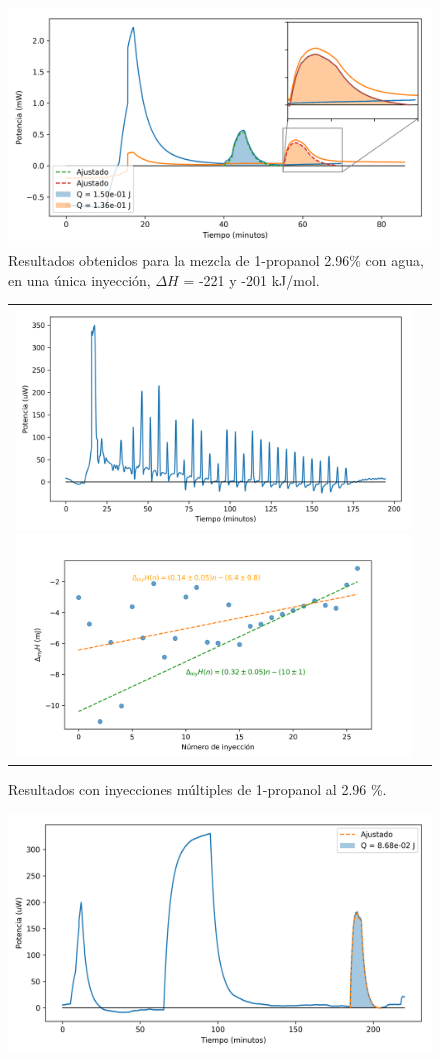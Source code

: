 \documentclass[a0]{sciposter}
\newcommand{\figwidth}{0.7\linewidth}
\begin{document}
\begin{multicols}{3}
	\begin{figure}[h]
		\centering
		\includegraphics[width=\figwidth]{../Data/ChemicalCalibrations/singlePropanol}
		\caption{Resultados obtenidos para la mezcla de 1-propanol 2.96\% con agua, en una \'unica inyecci\'on, $\Delta H$ = -221 y -201 kJ/mol.}
	\end{figure}
	\begin{figure}[h]
		\centering
		\begin{tabular}{cc}
			\includegraphics[width=0.47\linewidth]{../Data/ChemicalCalibrations/multiple}
			\includegraphics[width=0.53\linewidth]{../Data/ChemicalCalibrations/multipleInt}
		\end{tabular}
		\caption{Resultados con inyecciones m\'ultiples de 1-propanol al 2.96 \%.}
	\end{figure}	
	\begin{figure}[h]
		\centering
		\includegraphics[width=\figwidth]{../Data/ChemicalCalibrations/HCl}

\end{figure}
\end{multicols}
\end{document}
